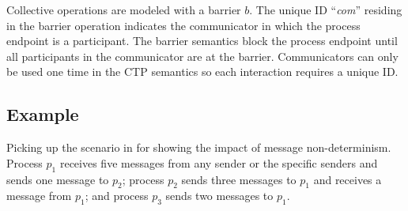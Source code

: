 Collective operations are modeled with a barrier $b$. The unique ID ``\textit{com}'' residing in the barrier operation indicates the communicator in which the process endpoint is a participant. The barrier semantics block the process endpoint until all participants in the communicator are at the barrier. Communicators can only be used one time in the CTP semantics so each interaction requires a unique ID.




\subsection{Example}

Picking up the scenario in  for showing the impact of message non-determinism. Process $p_1$ receives five messages from any sender or the specific senders and sends one message to $p_2$; process $p_2$ sends three messages to $p_1$ and receives a message from $p_1$; and process $p_3$ sends two messages to $p_1$. 


